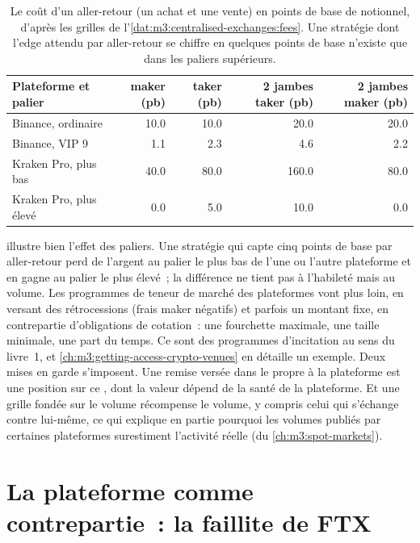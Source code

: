 \begin{table}[ht]
\centering
\small
\begin{tabular}{@{}lrrrr@{}}
\toprule
Plateforme et palier & maker (pb) & taker (pb) & 2 jambes taker (pb) & 2 jambes maker (pb) \\
\midrule
Binance, ordinaire & 10.0 & 10.0 & 20.0 & 20.0 \\
Binance, VIP 9 & 1.1 & 2.3 & 4.6 & 2.2 \\
Kraken Pro, plus bas & 40.0 & 80.0 & 160.0 & 80.0 \\
Kraken Pro, plus élevé & 0.0 & 5.0 & 10.0 & 0.0 \\
\bottomrule
\end{tabular}
\caption{Le coût d'un aller-retour (un achat et une vente) en points de base de notionnel, d'après les grilles de
l'\cref{dat:m3:centralised-exchanges:fees}. Une stratégie dont l'edge attendu par aller-retour se chiffre en quelques
points de base n'existe que dans les paliers supérieurs.}\label{tab:m3:centralised-exchanges:fees}
\end{table}

 illustre bien l'effet des paliers. Une stratégie qui capte cinq
points de base par aller-retour perd de l'argent au palier le plus bas de l'une ou l'autre plateforme et en gagne au palier le plus élevé~;
la différence ne tient pas à l'habileté mais au volume. Les programmes de teneur de marché des plateformes vont plus loin, en versant des rétrocessions
(frais maker négatifs) et parfois un montant fixe, en contrepartie d'obligations de cotation~: une fourchette maximale,
une taille minimale, une part du temps. Ce sont des programmes d'incitation au sens du livre~1, et
\cref{ch:m3:getting-access-crypto-venues} en détaille un exemple. Deux mises en garde s'imposent. Une remise versée dans le
 propre à la plateforme est une position sur ce , dont la valeur dépend de la santé de la plateforme. Et une
grille fondée sur le volume récompense le volume, y compris celui qui s'échange contre lui-même, ce qui explique en partie pourquoi
les volumes publiés par certaines plateformes surestiment l'activité réelle (du \cref{ch:m3:spot-markets}).

\section{La plateforme comme contrepartie~: la faillite de FTX}

